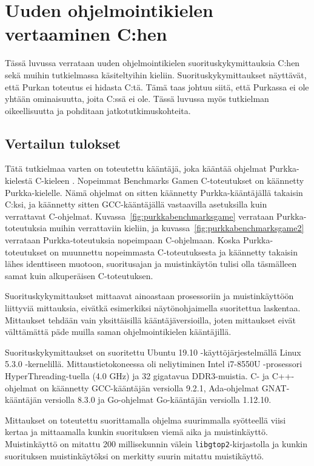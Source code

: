 \section{Uuden ohjelmointikielen vertaaminen C:hen}

Tässä luvussa verrataan uuden ohjelmointikielen suorituskykymittauksia C:hen
sekä muihin tutkielmassa käsiteltyihin kieliin. Suorituskykymittaukset
näyttävät, että Purkan toteutus ei hidasta C:tä. Tämä taas johtuu siitä, että
Purkassa ei ole yhtään ominaisuutta, joita C:ssä ei ole. Tässä luvussa myös
tutkielman oikeellisuutta ja pohditaan jatkotutkimuskohteita.

\subsection{Vertailun tulokset}
\label{sec:results}

Tätä tutkielmaa varten on toteutettu kääntäjä, joka kääntää ohjelmat
Purkka-kielestä C-kieleen \citep{purkka}. Nopeimmat Benchmarks Gamen
C-toteutukset on käännetty Purkka-kielelle. Nämä ohjelmat on sitten käännetty
Purkka-kääntäjällä takaisin C:ksi, ja käännetty sitten GCC-kääntäjällä
vastaavilla asetuksilla kuin verrattavat C-ohjelmat.
Kuvassa~\ref{fig:purkkabenchmarksgame} verrataan Purkka-toteutuksia muihin
verrattaviin kieliin, ja kuvassa~\ref{fig:purkkabenchmarksgame2} verrataan
Purkka-toteutuksia nopeimpaan C-ohjelmaan. Koska Purkka-toteutukset on
muunnettu nopeimmasta C-toteutuksesta ja käännetty takaisin lähes identtiseen
muotoon, suoritusajan ja muistinkäytön tulisi olla täsmälleen samat kuin
alkuperäisen C-toteutuksen.

Suorituskykymittaukset mittaavat ainoastaan prosessoriin ja muistinkäyttöön
liittyviä mittauksia, eivätkä esimerkiksi näytönohjaimella suoritettua
laskentaa. Mittaukset tehdään vain yksittäisillä kääntäjäversioilla, joten
mittaukset eivät välttämättä päde muilla saman ohjelmointikielen kääntäjillä.

Suorituskykymittaukset on suoritettu Ubuntu 19.10 -käyttöjärjestelmällä Linux
5.3.0 -kernelillä. Mittaustietokoneessa oli neliytiminen Intel i7-8550U
-prosessori Hy\-per\-Thread\-ing-tuella (4.0 GHz) ja 32 gigatavua DDR3-muistia.
C- ja C++-ohjelmat on käännetty GCC-kääntäjän versiolla 9.2.1, Ada-ohjelmat
GNAT-kääntäjän versiolla 8.3.0 ja Go-ohjelmat Go-kääntäjän versiolla 1.12.10.

Mittaukset on toteutettu suorittamalla ohjelma suurimmalla syötteellä viisi
kertaa ja mittaamalla kunkin suorituksen viemä aika ja muistinkäyttö.
Muistinkäyttö on mitattu 200 millisekunnin välein \texttt{libgtop2}-kirjastolla
ja kunkin suorituksen muistinkäytöksi on merkitty suurin mitattu muistikäyttö.

